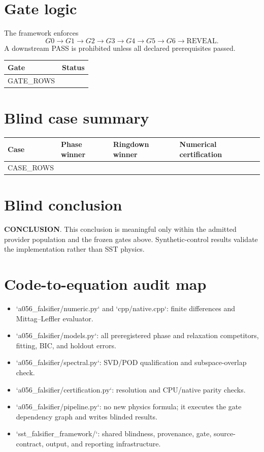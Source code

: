 \documentclass[11pt]{article}
\begin{document}
\section{Gate logic}
The framework enforces
\[
G0\rightarrow G1\rightarrow G2\rightarrow G3\rightarrow G4\rightarrow G5\rightarrow G6\rightarrow\mathrm{REVEAL}.
\]
A downstream PASS is prohibited unless all declared prerequisites passed.

\begin{longtable}{ll}
\toprule Gate & Status\\\midrule
{{GATE_ROWS}}
\bottomrule
\end{longtable}

\section{Blind case summary}
\begin{longtable}{llll}
\toprule Case & Phase winner & Ringdown winner & Numerical certification\\\midrule
{{CASE_ROWS}}
\bottomrule
\end{longtable}

\section{Blind conclusion}
\textbf{{{CONCLUSION}}}.  This conclusion is meaningful only within the admitted provider population and the frozen gates above.  Synthetic-control results validate the implementation rather than SST physics.

\section{Code-to-equation audit map}
\begin{itemize}
\item `a056\_falsifier/numeric.py` and `cpp/native.cpp`: finite differences and Mittag--Leffler evaluator.
\item `a056\_falsifier/models.py`: all preregistered phase and relaxation competitors, fitting, BIC, and holdout errors.
\item `a056\_falsifier/spectral.py`: SVD/POD qualification and subspace-overlap check.
\item `a056\_falsifier/certification.py`: resolution and CPU/native parity checks.
\item `a056\_falsifier/pipeline.py`: no new physics formula; it executes the gate dependency graph and writes blinded results.
\item `sst\_falsifier\_framework/`: shared blindness, provenance, gate, source-contract, output, and reporting infrastructure.
\end{itemize}
\end{document}
